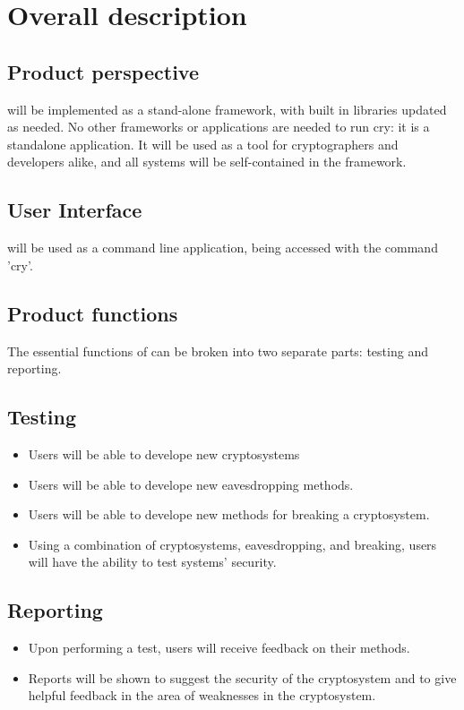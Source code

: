 \section{Overall description}
\dd


\subsection{Product perspective}

\cry{} will be implemented as a stand-alone framework, with built in libraries updated as needed. No other frameworks
or applications are needed to run cry: it is a standalone application. It will be used as a tool for cryptographers and
developers alike, and all systems will be self-contained in the framework.
  \subsection{User Interface}
  
  \cry{} will be used as a command line application, being accessed with the command 'cry'.


\subsection{Product functions}

The essential functions of \cry{} can be broken into two separate parts: testing and reporting.
  \subsection{Testing}
  \begin{itemize}
    \item Users will be able to develope new cryptosystems
    \item Users will be able to develope new eavesdropping methods.
    \item Users will be able to develope new methods for breaking a cryptosystem.
    \item Using a combination of cryptosystems, eavesdropping, and breaking, users will have the ability
    to test systems' security.
  \end{itemize}
  \subsection{Reporting}
  \begin{itemize}
    \item Upon performing a test, users will receive feedback on their methods.
    \item Reports will be shown to suggest the security of the cryptosystem and to give helpful feedback
    in the area of weaknesses in the cryptosystem.
  \end{itemize}

